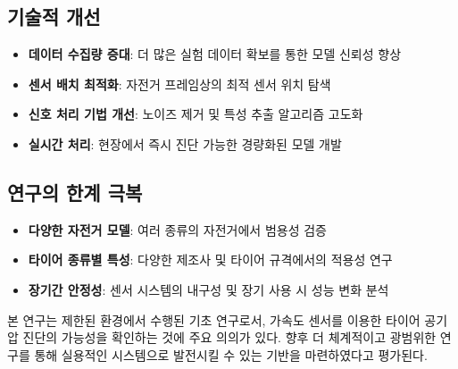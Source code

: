 \documentclass[12pt,a4paper]{article}
\begin{document}
\subsection{기술적 개선}
\label{subsec:technical_improvement}

\begin{itemize}
    \item \textbf{데이터 수집량 증대}: 더 많은 실험 데이터 확보를 통한 모델 신뢰성 향상
    \item \textbf{센서 배치 최적화}: 자전거 프레임상의 최적 센서 위치 탐색
    \item \textbf{신호 처리 기법 개선}: 노이즈 제거 및 특성 추출 알고리즘 고도화
    \item \textbf{실시간 처리}: 현장에서 즉시 진단 가능한 경량화된 모델 개발
\end{itemize}

\subsection{연구의 한계 극복}
\label{subsec:limitation_address}

\begin{itemize}
    \item \textbf{다양한 자전거 모델}: 여러 종류의 자전거에서 범용성 검증
    \item \textbf{타이어 종류별 특성}: 다양한 제조사 및 타이어 규격에서의 적용성 연구
    \item \textbf{장기간 안정성}: 센서 시스템의 내구성 및 장기 사용 시 성능 변화 분석
\end{itemize}

본 연구는 제한된 환경에서 수행된 기초 연구로서, 가속도 센서를 이용한 타이어 공기압 진단의 가능성을 확인하는 것에 주요 의의가 있다. 향후 더 체계적이고 광범위한 연구를 통해 실용적인 시스템으로 발전시킬 수 있는 기반을 마련하였다고 평가된다.

\newpage


\end{document}

